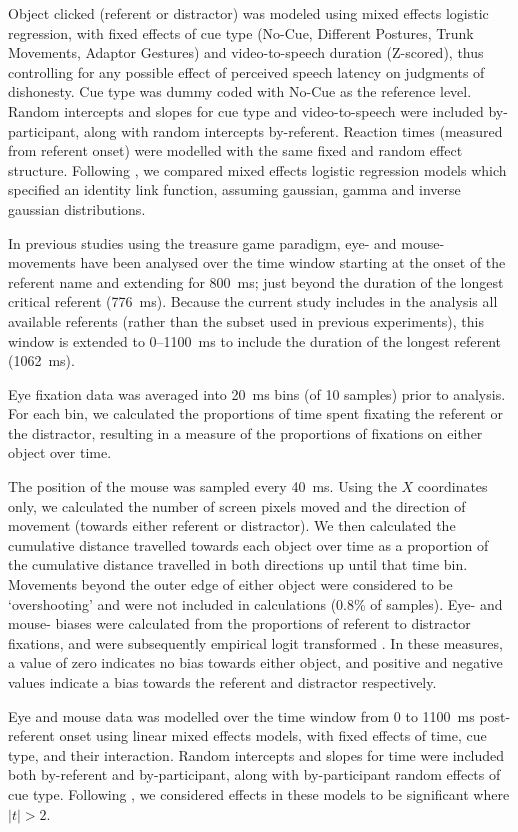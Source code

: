 \documentclass[a4paper,man,natbib]{apa6}
\begin{document}
Object clicked (referent or distractor) was modeled using mixed effects logistic regression, with fixed effects of cue type (No-Cue, Different Postures, Trunk Movements, Adaptor Gestures) and video-to-speech duration (Z-scored), thus controlling for any possible effect of perceived speech latency on judgments of dishonesty.
Cue type was dummy coded with No-Cue as the reference level.
Random intercepts and slopes for cue type and video-to-speech were included by-participant, along with random intercepts by-referent.
Reaction times (measured from referent onset) were modelled with the same fixed and random effect structure.
Following \citet{Lo2015}, we compared mixed effects logistic regression models which specified an identity link function, assuming gaussian, gamma and inverse gaussian distributions.

In previous studies using the treasure game paradigm, eye- and mouse- movements have been analysed over the time window starting at the onset of the referent name and extending for 800~ms; just beyond the duration of the longest critical referent (776~ms). 
Because the current study includes in the analysis all available referents (rather than the subset used in previous experiments), this window is extended to 0--1100~ms to include the duration of the longest referent (1062~ms).

Eye fixation data was averaged into 20~ms bins (of 10 samples) prior to analysis.
For each bin, we calculated the proportions of time spent fixating the referent or the distractor, resulting in a measure of the proportions of fixations on either object over time.

The position of the mouse was sampled every 40~ms.
Using the $X$ coordinates only, we calculated the number of screen pixels moved and the direction of movement (towards either referent or distractor).
We then calculated the cumulative distance travelled towards each object over time as a proportion of the cumulative distance travelled in both directions up until that time bin.
Movements beyond the outer edge of either object were considered to be `overshooting' and were not included in calculations (0.8\% of samples).
Eye- and mouse- biases were calculated from the proportions of referent to distractor fixations, and were subsequently empirical logit transformed \citep{Barr2008}. 
In these measures, a value of zero indicates no bias towards either object, and positive and negative values indicate a bias towards the referent and distractor respectively.

Eye and mouse data was modelled over the time window from 0 to 1100~ms post-referent onset using linear mixed effects models, with fixed effects of time, cue type, and their interaction.
Random intercepts and slopes for time were included both by-referent and by-participant, along with by-participant random effects of cue type.
Following \citet{Baayen2008}, we considered effects in these models to be significant where $|t|>2$.
\end{document}
